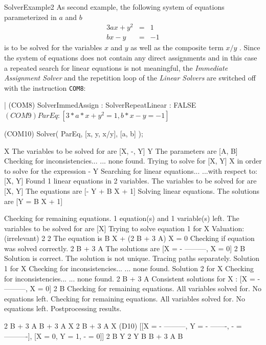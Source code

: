 \begin{example}{SolverExample2}
As  second example, the following system of equations parameterized in $a$ and $b$
\begin{eqnarray}
3ax + y^2 &=& 1 \\
 bx - y   &=& -1
\end{eqnarray}
is to be solved for the variables $x$ and $y$ as well as the composite term $x/y$ . Since the system of equations does not contain any direct assignments and in this case a repeated search for linear equations  is not meaningful, the {\em Immediate Assignment Solver} and the repetition loop of the {\em Linear Solvers}  are switched off with the instruction \verb+COM8+:
\begin{literatim}{|}
(COM8) SolverImmedAssign : SolverRepeatLinear : FALSE$

(COM9) ParEq : [ 3*a*x + y^2 =  1, b*x - y = -1 ]$

(COM10) Solver( ParEq, [x, y, x/y], [a, b] );

                                       X
The variables to be solved for are [X, -, Y]
                                       Y
The parameters are [A, B]
Checking for inconsistencies...
... none found.
Trying to solve for [X, Y]
                                     X
in order to solve for the expression -
                                     Y
Searching for linear equations...
  ...with respect to: [X, Y]
Found 1 linear equations in 2 variables.
The variables to be solved for are [X, Y]
The equations are [- Y + B X + 1]
Solving linear equations.
The solutions are [Y = B X + 1]

Checking for remaining equations.
1 equation(s) and 1 variable(s) left.
The variables to be solved for are [X]
Trying to solve equation 1 for X
Valuation: (irrelevant)
                 2  2
The equation is B  X  + (2 B + 3 A) X = 0
Checking if equation was solved correctly.
                         2 B + 3 A
The solutions are [X = - ---------, X = 0]
                             2
                            B
Solution is correct.
The solution is not unique. Tracing paths separately.
Solution 1 for X
Checking for inconsistencies...
... none found.
Solution 2 for X
Checking for inconsistencies...
... none found.
                                    2 B + 3 A
Consistent solutions for X : [X = - ---------, X = 0]
                                        2
                                       B
Checking for remaining equations.
All variables solved for. No equations left.
Checking for remaining equations.
All variables solved for. No equations left.
Postprocessing results.

              2 B + 3 A        B + 3 A  X   2 B + 3 A                   X
(D10) [[X = - ---------, Y = - -------, - = ----------], [X = 0, Y = 1, - = 0]]
                  2               B     Y    2                          Y
                 B                          B  + 3 A B
\end{literatim}
\end{example}





